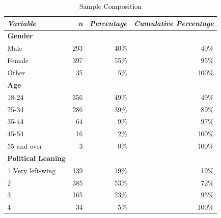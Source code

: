 \documentclass[empirical, authordate]{jote-new-article}
\begin{document}
\begin{table}
  \caption{Sample Composition}
  \label{tab:tableS2}

  \tiny
  \begin{tabularx}{\linewidth}{@{} X  r  r r@{}}

    \toprule
    \emph{Variable}                         & \emph{n} & \emph{Percentage} & \emph{Cumulative Percentage} \\
    \midrule

    \textbf{Gender}                         &          &                   &                              \\
    Male                                    & 293      & 40\%              & 40\%                         \\
    Female                                  & 397      & 55\%              & 95\%                         \\
    Other                                   & 35       & 5\%               & 100\%                        \\
    \textbf{Age}                            &          &                   &                              \\
    18-24                                   & 356      & 49\%              & 49\%                         \\
    25-34                                   & 286      & 39\%              & 89\%                         \\
    35-44                                   & 64       & 9\%               & 97\%                         \\
    45-54                                   & 16       & 2\%               & 100\%                        \\
    55 and over                             & 3        & 0\%               & 100\%                        \\
    \textbf{Political Leaning}              &          &                   &                              \\
    1 Very left-wing                        & 139      & 19\%              & 19\%                         \\
    2                                       & 385      & 53\%              & 72\%                         \\
    3                                       & 165      & 23\%              & 95\%                         \\
    4                                       & 34       & 5\%               & 100\%                        \\

\end{tabularx}
\end{table}
\end{document}
